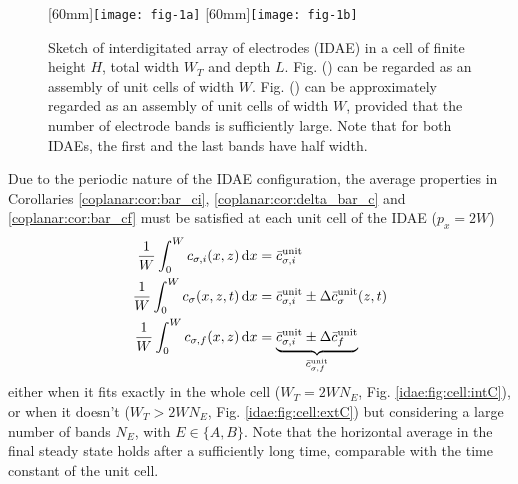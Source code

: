 \begin{figure}[t]
	\centering
	{\texttt{[image: fig-1a]}}
	{\texttt{[image: fig-1b]}}
	\caption{
		Sketch of interdigitated array of electrodes (IDAE) in a cell of finite height $H$,
		total width $W_{T}$ and depth $L$.
		Fig. () can be regarded as an assembly of unit cells of width $W$.
		Fig. () can be approximately regarded as an assembly of unit cells of width $W$,
		provided that the number of electrode bands is sufficiently large.
		Note that for both IDAEs, the first and the last bands have half width.
	}
	\label{idae:fig:cell}
\end{figure}

Due to the periodic nature of the IDAE configuration,
the average properties in Corollaries \ref{coplanar:cor:bar_ci}, \ref{coplanar:cor:delta_bar_c} and \ref{coplanar:cor:bar_cf}
must be satisfied at each unit cell of the IDAE ($p_{x} = 2W$)
\begin{subequations}
	\label{idae:eqn:bar_c:unit}
	\begin{align}
		\label{idae:eqn:bar_ci:unit}
		\frac{1}{W} \int_{0}^{W} c_{\sigma,i}(x,z) \,\mathrm{d}x
		&= \bar{c}_{\sigma,i}^{\text{unit}}
		\\
		\label{idae:eqn:bar_ct:unit}
		\frac{1}{W} \int_{0}^{W} c_{\sigma}(x,z,t) \,\mathrm{d}x
		&= \bar{c}_{\sigma,i}^{\text{unit}} \pm \Delta\bar{c}_{\sigma}^{\text{unit}}(z,t)
		\\
		\label{idae:eqn:bar_cf:unit}
		\frac{1}{W} \int_{0}^{W} c_{\sigma,f}(x,z) \,\mathrm{d}x
		&= \underbrace{\bar{c}_{\sigma,i}^{\text{unit}} \pm \Delta\bar{c}_{f}^{\text{unit}}}_{\bar{c}_{\sigma,f}^{\text{unit}}}
	\end{align}
\end{subequations}
either when it fits exactly in the whole cell ($W_{T} = 2W N_{E}$, Fig. \ref{idae:fig:cell:intC}),
or when it doesn't ($W_{T} > 2W N_{E}$, Fig. \ref{idae:fig:cell:extC})
but considering a large number of bands $N_{E}$, with $E \in \{A,B\}$.
Note that the horizontal average in the final steady state holds after a sufficiently long time,
comparable with the time constant of the unit cell.

